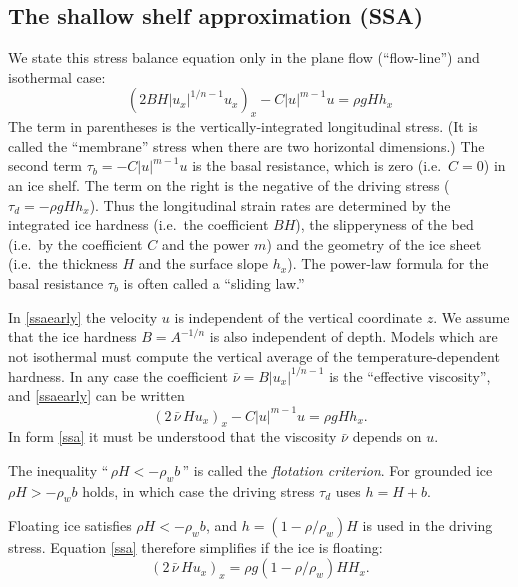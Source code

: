\documentclass[letterpaper,final,12pt,reqno]{amsart}
\begin{document}
\subsection*{The shallow shelf approximation (SSA)}  We state this stress balance equation only in the plane flow (``flow-line'') and isothermal case:
\begin{equation}
  \left(2 B H |u_x|^{1/n - 1} u_x\right)_x - C|u|^{m-1}u = \rho g H h_x \label{ssaearly}
\end{equation}
The term in parentheses is the vertically-integrated longitudinal stress.  (It is called the ``membrane'' stress when there are two horizontal dimensions.)  The second term $\tau_b = - C|u|^{m-1}u$ is the basal resistance, which is zero (i.e.~$C=0$) in an ice shelf.  The term on the right is the negative of the driving stress ($\tau_d = - \rho g H h_x$).  Thus the longitudinal strain rates are determined by the integrated ice hardness (i.e.~the coefficient $BH$), the slipperyness of the bed (i.e.~by the coefficient $C$ and the power $m$) and the geometry of the ice sheet (i.e.~the thickness $H$ and the surface slope $h_x$).  The power-law formula for the basal resistance $\tau_b$ is often called a ``sliding law.''

In \eqref{ssaearly} the velocity $u$ is independent of the vertical coordinate $z$.  We assume that the ice hardness $B=A^{-1/n}$ is also independent of depth.  Models which are not isothermal must compute the vertical average of the temperature-dependent hardness.  In any case the coefficient $\bar \nu = B |u_x|^{1/n-1}$ is the ``effective viscosity'', and \eqref{ssaearly} can be written
\begin{equation}
  \left(2 \,\bar \nu\, H u_x\right)_x - C |u|^{m-1} u = \rho g H h_x.  \label{ssa}
\end{equation}
In form \eqref{ssa} it must be understood that the viscosity $\bar\nu$ depends on $u$.

The inequality ``$\,\rho H < - \rho_w b\,$'' is called the \emph{flotation criterion}.  For grounded ice $\rho H > - \rho_w b$ holds, in which case the driving stress $\tau_d$ uses $h = H+b$.

Floating ice satisfies $\rho H < - \rho_w b$, and $h = (1-\rho/\rho_w) H$ is used in the driving stress.  Equation \eqref{ssa} therefore simplifies if the ice is floating:
\begin{equation}
   \left(2 \,\bar\nu\, H u_x\right)_x = \rho g (1-\rho/\rho_w) H H_x. \label{ssafloat}
\end{equation}
\end{document}
